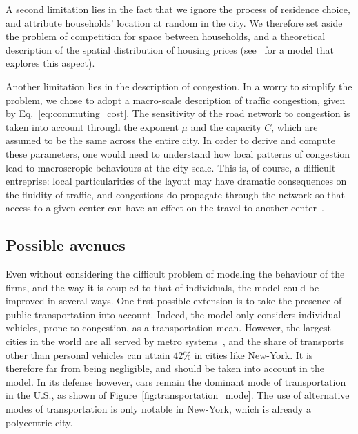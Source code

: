 A second limitation lies in the fact that we ignore the process of residence
choice, and attribute households' location at random in the city. We
therefore set aside the problem of competition for space between households, and
a theoretical description of the spatial distribution of housing prices
(see~\cite{Gauvin:2013} for a model that explores this aspect).

Another limitation lies in the description of congestion. In a worry to
simplify the problem, we chose to adopt a macro-scale description of
traffic congestion, given by Eq.~\ref{eq:commuting_cost}. The sensitivity of the
road network to congestion is taken into account through the exponent $\mu$ and
the capacity $C$, which are assumed to be the same across the entire city. In
order to derive and compute these parameters, one would need to understand how local
patterns of congestion lead to macroscropic behaviours at the city scale. This
is, of course, a difficult entreprise:  local particularities of the layout may
have dramatic consequences on the fluidity of traffic, and congestions do
propagate through the network so that access to a given center can have an
effect on the travel to another center~\cite{Li:2015}. 

\subsection{Possible avenues}
\label{sub:possible_avenues}

Even without considering the difficult problem of modeling the behaviour of the
firms, and the way it is coupled to that of individuals, the model could be
improved in several ways. 
One first possible extension is to take the presence of public transportation
into account. Indeed, the model only considers individual vehicles, prone to
congestion, as a transportation mean.  However, the largest cities in the world
are all served by metro systems~\cite{Roth:2012}, and the share of transports
other than personal vehicles can attain $42\%$ in cities like New-York. It is therefore far from
being negligible, and should be taken into account in the model. In its defense 
however, cars remain the dominant mode of transportation in the U.S., as shown of
Figure~\ref{fig:transportation_mode}. The use of alternative modes of
transportation is only notable in New-York, which is already a polycentric
city.\\

